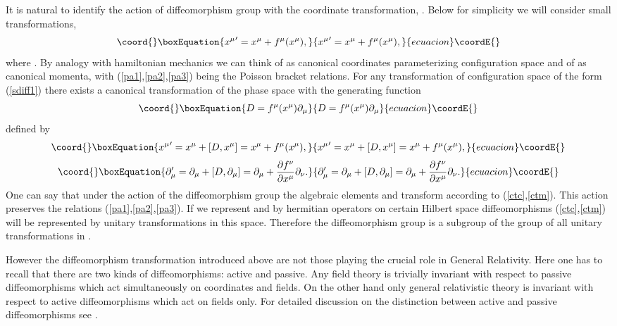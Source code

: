 \documentclass[a4paper,11pt]{article}
\begin{document}
It is natural to identify the action of diffeomorphism group with
the coordinate transformation, \coordHE{}. Below
for simplicity we will consider small transformations,
\begin{equation}\coord{}\boxEquation{
{x^\mu}'=x^\mu+f^\mu(x^\mu), \label{sdiff1}
}{
{x^\mu}'=x^\mu+f^\mu(x^\mu), }{ecuacion}\coordE{}\end{equation}
where \coordHE{}. By analogy with hamiltonian mechanics we
can think of \coordHE{} as canonical coordinates parameterizing
configuration space and of \myHighlight{$\partial_\mu$}\coordHE{} as canonical momenta,
with (\ref{pa1},\ref{pa2},\ref{pa3}) being the Poisson bracket
relations. For any transformation of configuration space  of the
form (\ref{sdiff1}) there exists a canonical transformation of the
phase space with the generating function
\begin{equation}\coord{}\boxEquation{
D=f^\mu(x^\mu)\partial_\mu \label{diffgen}
}{
D=f^\mu(x^\mu)\partial_\mu }{ecuacion}\coordE{}\end{equation}
 defined by
\begin{equation}\coord{}\boxEquation{
{x^\mu}'=x^\mu+[D,x^\mu]=x^\mu+f^\mu(x^\mu), \label{ctc}
}{
{x^\mu}'=x^\mu+[D,x^\mu]=x^\mu+f^\mu(x^\mu), }{ecuacion}\coordE{}\end{equation}
\begin{equation}\coord{}\boxEquation{
\partial_\mu'=\partial_\mu+[D,\partial_\mu]=\partial_\mu+\frac{\partial f^{\nu}}{\partial
x^{\mu}}\partial_\nu. \label{ctm}
}{
\partial_\mu'=\partial_\mu+[D,\partial_\mu]=\partial_\mu+\frac{\partial f^{\nu}}{\partial
x^{\mu}}\partial_\nu. }{ecuacion}\coordE{}\end{equation}
One can say that under the action of the diffeomorphism group the
algebraic elements \coordHE{} and \coordHE{} transform according to
(\ref{ctc},\ref{ctm}). This action preserves the relations
(\ref{pa1},\ref{pa2},\ref{pa3}). If we represent \coordHE{} and
\coordHE{} by hermitian operators on certain Hilbert space \coordHE{}
diffeomorphisms (\ref{ctc},\ref{ctm}) will be represented by
unitary transformations in this space. Therefore the
diffeomorphism group is a subgroup of the group of all unitary
transformations in \coordHE{}.

However the diffeomorphism transformation introduced above are not
those playing the crucial role in General Relativity. Here one has
to recall that there are two kinds of diffeomorphisms: active and
passive. Any field theory is trivially invariant with respect to
passive diffeomorphisms which act simultaneously on coordinates
and fields. On the other hand only general relativistic theory is
invariant with respect to active diffeomorphisms which act on
fields only. For detailed discussion on the distinction between
active and passive diffeomorphisms see \cite{RovelliGaul}.
\end{document}
